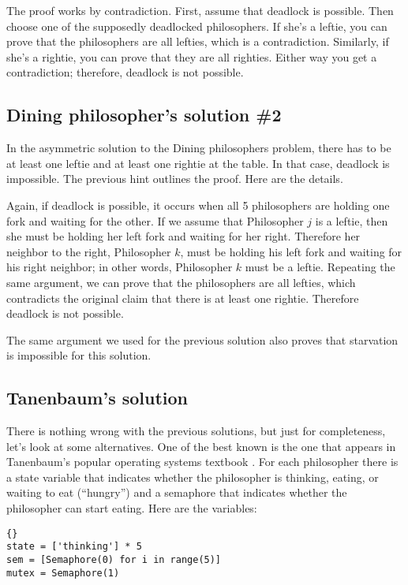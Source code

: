 \documentclass{book}
\newcommand{\clearemptydoublepage}{\newpage\cleardoublepage}
\begin{document}
The proof works by contradiction.  First, assume that deadlock is
possible.  Then choose one of the supposedly deadlocked philosophers.
If she's a leftie, you can prove that the philosophers are all
lefties, which is a contradiction.  Similarly, if she's a rightie, you
can prove that they are all righties.  Either way you get a
contradiction; therefore, deadlock is not possible.


\clearemptydoublepage
\subsection{Dining philosopher's solution \#2}

In the asymmetric solution to the Dining philosophers problem,
there has to be at least one leftie and at least one rightie at
the table.  In that case, deadlock is impossible.  The previous
hint outlines the proof.  Here are the details.

Again, if deadlock is possible, it occurs when all 5 philosophers
are holding one fork and waiting for the other.  If we assume that
Philosopher $j$ is a leftie, then she must be holding her left
fork and waiting for her right.  Therefore her neighbor to the right,
Philosopher $k$, must be holding his left fork and waiting for
his right neighbor; in other words, Philosopher $k$ must be a leftie.
Repeating the same argument, we can prove that the philosophers
are all lefties, which contradicts the original claim that there
is at least one rightie.  Therefore deadlock is not possible.

The same argument we used for the previous solution also proves
that starvation is impossible for this solution.


\clearemptydoublepage
\subsection{Tanenbaum's solution}

There is nothing wrong with the previous solutions, but just for
completeness, let's look at some alternatives.  One of the best known
is the one that appears in Tanenbaum's popular operating systems
textbook \cite{tanenbaum}.
For each philosopher there is a state variable that
indicates whether the philosopher is thinking, eating, or waiting to
eat (``hungry'') and a semaphore that indicates whether the
philosopher can start eating.  Here are the variables:

\begin{lstlisting}[title={Variables for Tanenbaum's solution}]{}
state = ['thinking'] * 5
sem = [Semaphore(0) for i in range(5)]
mutex = Semaphore(1)
\end{lstlisting}
\end{document}
